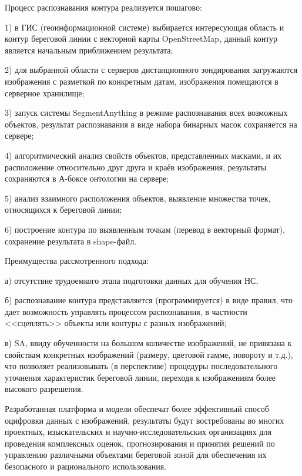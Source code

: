 Процесс распознавания контура реализуется пошагово: 

1) в ГИС (геоинформационной системе) выбирается интересующая область и контур береговой линии с векторной карты OpenStreetMap, данный контур является начальным приближением результата; 

2) для выбранной области с серверов дистанционного зондирования загружаются изображения с разметкой по конкретным датам, изображения помещаются в серверное хранилище; 

3) запуск системы SegmentAnything в режиме распознавания всех возможных объектов, результат распознавания в виде набора бинарных масок сохраняется на сервере; 

4) алгоритмический анализ свойств объектов, представленных масками, и их расположение относительно друг друга и краёв изображения, результаты сохраняются в А-боксе онтологии на сервере; 

5) анализ взаимного расположения объектов, выявление множества точек, относящихся к береговой линии; 

6) построение контура по выявленным точкам (перевод в векторный формат), сохранение результата в shape-файл.

Преимущества рассмотренного подхода: 

а) отсутствие трудоемкого этапа подготовки данных для обучения НС, 

б) распознавание контура представляется (программируется) в виде правил, что дает возможность управлять процессом распознавания, в частности <<сцеплять>> объекты или контуры с разных изображений; 

в) SA, ввиду обученности на большом количестве изображений, не привязана к свойствам конкретных изображений (размеру, цветовой гамме, повороту и т.д.), что позволяет 
реализовывать (в перспективе) процедуры последовательного уточнения характеристик береговой линии, переходя к изображениям более высокого разрешения.

Разработанная платформа и модели обеспечат более эффективный способ оцифровки данных с изображений, результаты будут востребованы во многих проектных, изыскательских и научно-исследовательских организациях для проведения комплексных оценок, прогнозирования и принятия решений по управлению различными объектами береговой зоной для обеспечения их безопасного и рационального использования.


